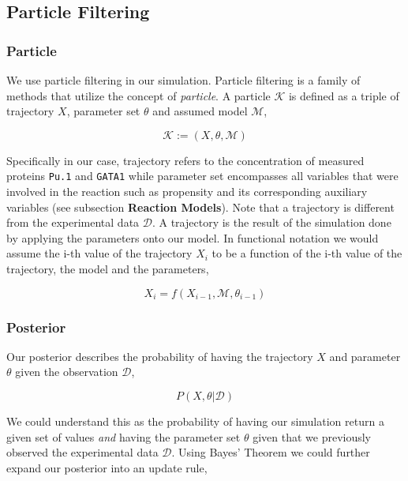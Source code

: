 \documentclass{bioinfo}
\begin{document}
\subsection{Particle Filtering}

\subsubsection{Particle}

We use particle filtering in our simulation. Particle filtering is a family of methods that utilize the concept of \textit{particle}. A particle $\mathcal{K}$ is defined as a triple of trajectory $X$, parameter set $\theta$ and assumed model $\mathcal{M}$,

\begin{equation}
\mathcal{K} := (X, \theta, \mathcal{M})\label{eq:01}
\end{equation}

Specifically in our case, trajectory refers to the concentration of measured proteins \texttt{Pu.1} and \texttt{GATA1} while parameter set encompasses all variables that were involved in the reaction such as propensity and its corresponding auxiliary variables (see subsection \textbf{Reaction Models}). Note that a trajectory is different from the experimental data $\mathcal{D}$. A trajectory is the result of the simulation done by applying the parameters onto our model. In functional notation we would assume the i-th value of the trajectory $X_i$ to be a function of the i-th value of the trajectory, the model and the parameters,

\begin{equation}
X_i = f(X_{i - 1}, \mathcal{M}, \theta_{i - 1})\label{eq:02}
\end{equation}

\subsubsection{Posterior}

Our posterior describes the probability of having the trajectory $X$ and parameter $\theta$ given the observation $\mathcal{D}$,

\begin{equation}
P(X, \theta | \mathcal{D})\label{eq:03}
\end{equation}

We could understand this as the probability of having our simulation return a given set of values \textit{and} having the parameter set $\theta$ given that we previously observed the experimental data $\mathcal{D}$. Using Bayes' Theorem we could further expand our posterior into an update rule,
\end{document}
